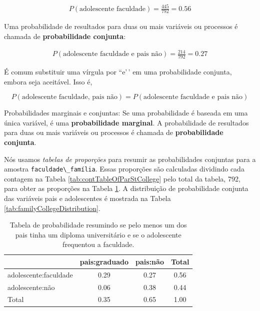 \documentclass[
]{book}
\theoremstyle{definition}
\theoremstyle{definition}
\theoremstyle{definition}
\theoremstyle{definition}
\theoremstyle{remark}
\begin{document}
\begin{align*}
P(\text{adolescente faculdade}) = \frac{445}{792} = 0.56
\end{align*}

Uma probabilidade de resultados para duas ou mais variáveis ou processos é chamada de \textbf{probabilidade conjunta}:

\begin{align*}
P(\text{adolescente faculdade e pais não}) = \frac{214}{792} = 0.27
\end{align*}

É comum substituir uma vírgula por ``e'\,' em uma probabilidade conjunta, embora seja aceitável. Isso é,

\[
P(\text{adolescente faculdade, pais não}) = P(\text{adolescente faculdade e pais não})
\]

Probabilidades marginais e conjuntas: Se uma probabilidade é baseada em uma única variável, é uma \textbf{probabilidade marginal}. A probabilidade de resultados para duas ou mais variáveis ou processos é chamada de \textbf{probabilidade conjunta}.

Nós usamos \emph{tabelas de proporções} para resumir as probabilidades conjuntas para a amostra \texttt{faculdade\textbackslash{}\_família}. Essas proporções são calculadas dividindo cada contagem na Tabela \ref{tab:contTableOfParStCollege} pelo total da tabela, 792, para obter as proporções na Tabela \ref{tab:familyCollegeProbTable}. A distribuição de probabilidade conjunta das variáveis pais e adolescentes é mostrada na Tabela \ref{tab:familyCollegeDistribution}.

\begin{table}

\caption{\label{tab:familyCollegeProbTable}Tabela de probabilidade resumindo se pelo menos um dos pais tinha um diploma universitário e se o adolescente frequentou a faculdade.}
\centering
\begin{tabular}[t]{l|c|c|c}
\hline
  & pais:graduado & pais:não & Total\\
\hline
adolescente:faculdade & 0.29 & 0.27 & 0.56\\
\hline
adolescente:não & 0.06 & 0.38 & 0.44\\
\hline
Total & 0.35 & 0.65 & 1.00\\
\hline
\end{tabular}
\end{table}
\end{document}
